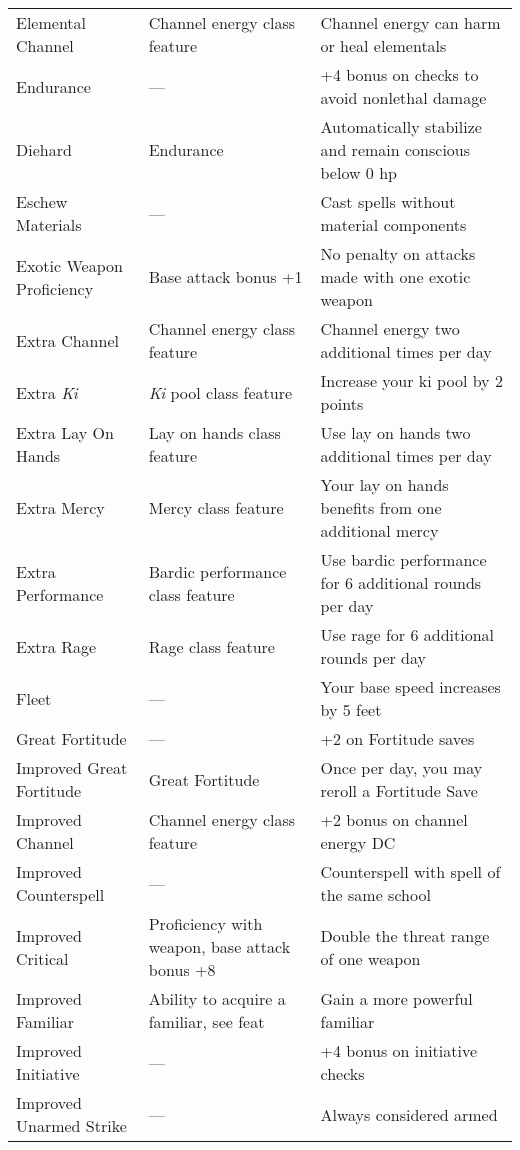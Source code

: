 \begin{table*}
\sffamily
  \setlength{\tabcolsep}{1pt}
\begin{tabularx}{\linewidth}{lXl}
Elemental Channel & Channel energy class feature & Channel energy can harm or heal elementals\\
Endurance & --- & +4 bonus on checks to avoid nonlethal damage\\
\quad Diehard & Endurance & Automatically stabilize and remain conscious below 0 hp\\
Eschew Materials & --- & Cast spells without material components\\
Exotic Weapon Proficiency & Base attack bonus +1 & No penalty on attacks made with one exotic weapon\\
Extra Channel & Channel energy class feature & Channel energy two additional times per day\\
Extra \textit{Ki} & \textit{Ki} pool class feature & Increase your ki pool by 2 points\\
Extra Lay On Hands & Lay on hands class feature & Use lay on hands two additional times per day\\
Extra Mercy & Mercy class feature & Your lay on hands benefits from one additional mercy\\
Extra Performance & Bardic performance class feature & Use bardic performance for 6 additional rounds per day\\
Extra Rage & Rage class feature & Use rage for 6 additional rounds per day\\
Fleet & --- & Your base speed increases by 5 feet\\
Great Fortitude & --- & +2 on Fortitude saves\\
\quad Improved Great Fortitude & Great Fortitude & Once per day, you may reroll a Fortitude Save\\
Improved Channel & Channel energy class feature & +2 bonus on channel energy DC\\
Improved Counterspell & --- & Counterspell with spell of the same school\\
Improved Critical & Proficiency with weapon, base attack bonus +8 & Double the threat range of one weapon\\
Improved Familiar & Ability to acquire a familiar, see feat & Gain a more powerful familiar\\
Improved Initiative & --- & +4 bonus on initiative checks\\
Improved Unarmed Strike & --- & Always considered armed\\

\end{tabularx}
\end{table*}
